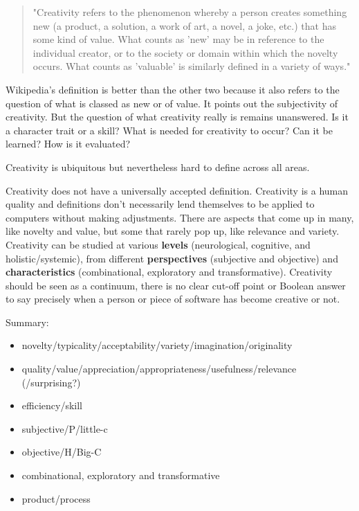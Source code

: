 \begin{quote}
  "Creativity refers to the phenomenon whereby a person creates something new (a product, a solution, a work of art, a novel, a joke, etc.) that has some kind of value. What counts as 'new' may be in reference to the individual creator, or to the society or domain within which the novelty occurs. What counts as 'valuable' is similarly defined in a variety of ways."
\end{quote}

Wikipedia's definition is better than the other two because it also refers to the question of what is classed as new or of value. It points out the subjectivity of creativity. But the question of what creativity really is remains unanswered. Is it a character trait or a skill? What is needed for creativity to occur? Can it be learned? How is it evaluated?

Creativity is ubiquitous but nevertheless hard to define across all areas.

Creativity does not have a universally accepted definition. Creativity is a human quality and definitions don’t necessarily lend themselves to be applied to computers without making adjustments. There are aspects that come up in many, like novelty and value, but some that rarely pop up, like relevance and variety. Creativity can be studied at various \textbf{levels} (neurological, cognitive, and holistic/systemic), from different \textbf{perspectives} (subjective and objective) and \textbf{characteristics} (combinational, exploratory and transformative). Creativity should be seen as a continuum, there is no clear cut-off point or Boolean answer to say precisely when a person or piece of software has become creative or not.

\begin{shaded}
  Summary:\\
  \begin{itemize}
    \item novelty/typicality/acceptability/variety/imagination/originality
    \item quality/value/appreciation/appropriateness/usefulness/relevance (/surprising?)
    \item efficiency/skill
    \item subjective/P/little-c
    \item objective/H/Big-C
    \item combinational, exploratory and transformative
    \item product/process
  \end{itemize}
\end{shaded}\citep{Berners-Lee1998, Everitt2013, Everitt2012}

